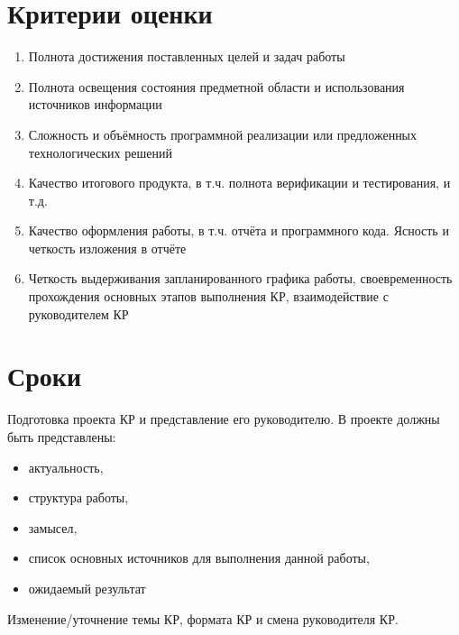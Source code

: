 \documentclass[letterpaper,10pt,russian]{sphinxmanual}
\begin{document}
\section{Критерии оценки}
\label{\detokenize{coursework:id3}}\begin{enumerate}
\item {} 
Полнота  достижения поставленных целей и задач работы

\item {} 
Полнота освещения состояния предметной области и использования источников информации

\item {} 
Сложность и объёмность программной  реализации или предложенных технологических решений

\item {} 
Качество итогового продукта, в т.ч. полнота верификации и тестирования, и т.д.

\item {} 
Качество оформления работы, в т.ч. отчёта и программного кода. Ясность и четкость изложения в отчёте

\item {} 
Четкость выдерживания запланированного графика работы, своевременность прохождения основных этапов выполнения КР, взаимодействие с руководителем КР

\end{enumerate}


\section{Сроки}
\label{\detokenize{coursework:id4}}
Подготовка проекта КР и представление его руководителю. В проекте должны быть представлены:
\begin{itemize}
\item {} 
актуальность,

\item {} 
структура работы,

\item {} 
замысел,

\item {} 
список основных источников для выполнения данной работы,

\item {} 
ожидаемый результат

\end{itemize}

Изменение/уточнение темы КР, формата КР и смена руководителя КР.
\end{document}
